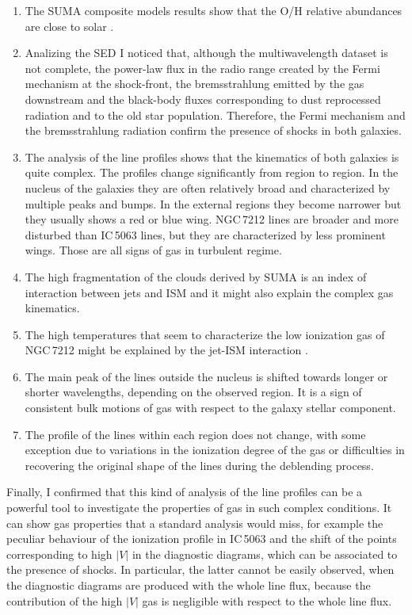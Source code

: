 \documentclass[../main.tex]{subfiles}
\begin{document}
\begin{enumerate}
\item The SUMA composite models results show that the O/H relative abundances are close to solar \citep{Allen76}.

\item Analizing the SED I noticed that, although the multiwavelength dataset is not complete, the power-law flux in the radio range created by the Fermi mechanism at the shock-front, the bremsstrahlung emitted by the gas downstream and the black-body fluxes corresponding to dust reprocessed radiation and to the old star population.
Therefore, the Fermi mechanism and the bremsstrahlung radiation confirm the presence of shocks in both galaxies.

\item The analysis of the line profiles shows that the kinematics of both galaxies is quite complex.
The profiles change significantly from region to region. 
In the nucleus of the galaxies they are often relatively broad and characterized by multiple peaks and bumps. 
In the external regions they become narrower but they usually shows a red or blue wing.
NGC\,7212 lines are broader and more disturbed than IC\,5063 lines, but they are characterized by less prominent wings.
Those are all signs of gas in turbulent regime.

\item The high fragmentation of the clouds derived by SUMA is an index of interaction between jets and ISM and it might also explain the complex gas kinematics.

\item The high temperatures that seem to characterize the low ionization gas of NGC\,7212 might be explained by the jet-ISM interaction \citep{Roche16}.

\item The main peak of the lines outside the nucleus is shifted towards longer or shorter wavelengths, depending on the observed region.
It is a sign of consistent bulk motions of gas with respect to the galaxy stellar component.

\item The profile of the lines within each region does not change, with some exception due to variations in the ionization degree of the gas or difficulties in recovering the original shape of the lines during the deblending process.
\end{enumerate}

Finally, I confirmed that this kind of analysis of the line profiles can be a powerful tool to investigate the properties of gas in such complex conditions.
It can show  gas properties that a standard analysis would miss, for example the peculiar behaviour of the ionization profile in IC\,5063 and the shift of the points corresponding to high $\lvert V\rvert$ in the diagnostic diagrams, which can be associated to the presence of shocks.
In particular, the latter cannot be easily observed, when the diagnostic diagrams are produced with the whole line flux, because the contribution of the high $\lvert V\rvert$ gas is negligible with respect to the whole line flux.
\end{document}
